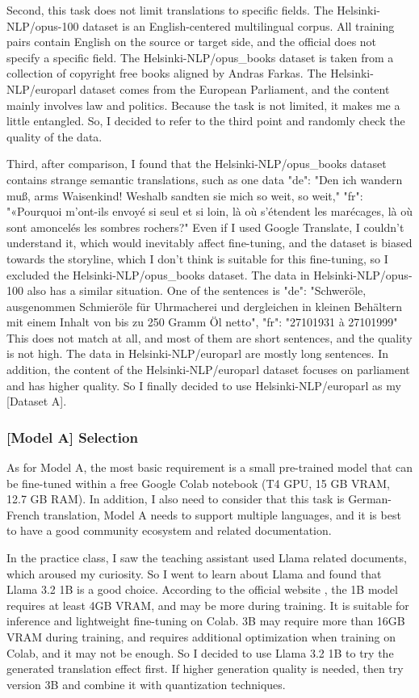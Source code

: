 Second, this task does not limit translations to specific fields.
The Helsinki-NLP/opus-100 dataset is an English-centered multilingual corpus.
All training pairs contain English on the source or target side,
and the official does not specify a specific field.
The Helsinki-NLP/opus\_books dataset is taken from
a collection of copyright free books aligned by Andras Farkas.
The Helsinki-NLP/europarl dataset comes from the European Parliament, 
and the content mainly involves law and politics. 
Because the task is not limited, it makes me a little entangled.
So, I decided to refer to the third point and randomly check the quality of the data.

Third, after comparison,
I found that the Helsinki-NLP/opus\_books dataset contains strange semantic translations, 
such as one data "de": "Den ich wandern muß, arms Waisenkind! Weshalb sandten sie mich so weit, so weit," 
"fr": "«Pourquoi m'ont-ils envoyé si seul et si loin, là où s'étendent les marécages, 
là où sont amoncelés les sombres rochers?" 
Even if I used Google Translate, I couldn't understand it, 
which would inevitably affect fine-tuning, 
and the dataset is biased towards the storyline, 
which I don't think is suitable for this fine-tuning, 
so I excluded the Helsinki-NLP/opus\_books dataset.
The data in Helsinki-NLP/opus-100 also has a similar situation. 
One of the sentences is "de": "Schweröle, ausgenommen Schmieröle für 
Uhrmacherei und dergleichen in kleinen Behältern mit einem Inhalt von 
bis zu 250 Gramm Öl netto", "fr": "27101931 à 27101999" 
This does not match at all, and most of them are short sentences, 
and the quality is not high. The data in Helsinki-NLP/europarl are mostly long sentences. 
In addition, the content of the Helsinki-NLP/europarl dataset focuses on parliament and has higher quality. 
So I finally decided to use Helsinki-NLP/europarl as my [Dataset A].

\subsubsection{[Model A] Selection}
As for Model A, 
the most basic requirement is a small pre-trained model 
that can be fine-tuned within a free Google Colab notebook 
(T4 GPU, 15 GB VRAM, 12.7 GB RAM). 
In addition, I also need to consider that this task is German-French translation, 
Model A needs to support multiple languages, 
and it is best to have a good community ecosystem and related documentation.

In the practice class, 
I saw the teaching assistant used Llama related documents, 
which aroused my curiosity. 
So I went to learn about Llama and found that Llama 3.2 1B is a good choice. 
According to the official website \cite{llama-website}, 
the 1B model requires at least 4GB VRAM, and may be more during training. 
It is suitable for inference and lightweight fine-tuning on Colab.
3B may require more than 16GB VRAM during training, 
and requires additional optimization when training on Colab, and it may not be enough. 
So I decided to use Llama 3.2 1B to try the generated translation effect first. 
If higher generation quality is needed, then try version 3B and combine it with quantization techniques.

